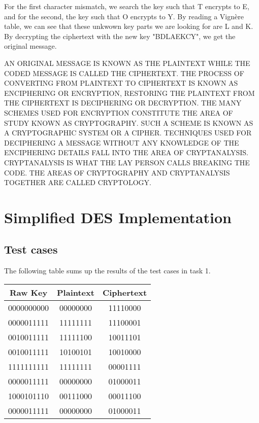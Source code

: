 \documentclass{article}
\begin{document}
For the first character mismatch, we search the key such that T encrypts to E, and for the second, the key such that O encrypts to Y. By reading a Vignère table, we can see that these unkwown key parts we are looking for are L and K.
By decrypting the ciphertext with the new key "BDLAEKCY", we get the original message.
\bigskip

\sloppy
AN ORIGINAL MESSAGE IS KNOWN AS THE PLAINTEXT WHILE THE CODED MESSAGE IS CALLED THE CIPHERTEXT. THE PROCESS OF CONVERTING FROM PLAINTEXT TO CIPHERTEXT IS KNOWN AS ENCIPHERING OR ENCRYPTION,  RESTORING THE PLAINTEXT FROM THE CIPHERTEXT IS DECIPHERING OR DECRYPTION. THE MANY SCHEMES USED FOR ENCRYPTION CONSTITUTE THE AREA OF STUDY KNOWN AS CRYPTOGRAPHY. SUCH A SCHEME IS KNOWN AS A CRYPTOGRAPHIC SYSTEM OR A CIPHER. TECHNIQUES USED FOR DECIPHERING A MESSAGE WITHOUT ANY KNOWLEDGE OF THE ENCIPHERING DETAILS FALL INTO THE AREA OF CRYPTANALYSIS. CRYPTANALYSIS IS WHAT THE LAY PERSON CALLS BREAKING THE CODE. THE AREAS OF CRYPTOGRAPHY AND CRYPTANALYSIS TOGETHER ARE CALLED CRYPTOLOGY.

\section{Simplified DES Implementation}

\subsection{Test cases}

The following table sums up the results of the test cases in task 1.

\begin{center}
    \begin{tabular}{|c c c|}
        \hline
        \textbf{Raw Key} & \textbf{Plaintext} & \textbf{Ciphertext} \\
        \hline
        0000000000 & 00000000 & 11110000 \\
        0000011111 & 11111111 & 11100001 \\
        0010011111 & 11111100 & 10011101 \\
        0010011111 & 10100101 & 10010000 \\
        1111111111 & 11111111 & 00001111 \\
        0000011111 & 00000000 & 01000011 \\
        1000101110 & 00111000 & 00011100 \\
        0000011111 & 00000000 & 01000011 \\
        \hline
    \end{tabular}
\end{center}
\end{document}
